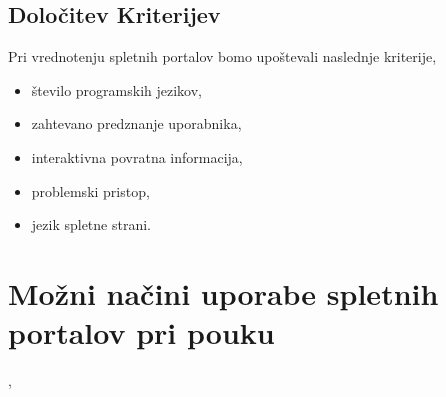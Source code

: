 \subsection{Določitev Kriterijev}
\label{sec:dolocitev_kriterijev}

Pri vrednotenju spletnih portalov bomo upoštevali naslednje
kriterije,


\begin{itemize}
\tightlist
\item število programskih jezikov,
\item zahtevano predznanje uporabnika,
\item interaktivna povratna informacija,
\item problemski pristop,
\item jezik spletne strani.
\end{itemize}

\section{Možni načini uporabe spletnih portalov pri pouku}
\label{sec:načini_uporabe_sp},

